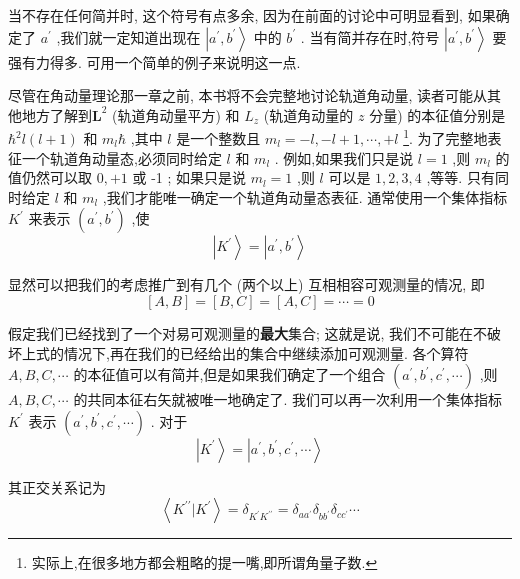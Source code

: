 \documentclass[lang=cn,newtx,10pt,scheme=chinese,thmcnt=section]{elegantbook}
\begin{document}
当不存在任何简并时, 这个符号有点多余, 因为在前面的讨论中可明显看到, 如果确定了 ${a}^{\prime }$ ,我们就一定知道出现在 $\left| {{a}^{\prime },{b}^{\prime }}\right\rangle$ 中的 ${b}^{\prime }$ . 当有简并存在时,符号 $\left| {{a}^{\prime },{b}^{\prime }}\right\rangle$ 要强有力得多. 可用一个简单的例子来说明这一点.

尽管在角动量理论那一章之前, 本书将不会完整地讨论轨道角动量, 读者可能从其他地方了解到${\mathbf{L}}^{2}$ (轨道角动量平方) 和 ${L}_{z}$ (轨道角动量的 $z$ 分量) 的本征值分别是 ${\hbar }^{2}l\left( {l + 1}\right)$ 和 ${m}_{l}\hbar$ ,其中 $l$ 是一个整数且 ${m}_{l} = - l, - l + 1,\cdots , + l$ \footnote{实际上,在很多地方都会粗略的提一嘴,即所谓角量子数.}. 为了完整地表征一个轨道角动量态,必须同时给定 $l$ 和 ${m}_{l}$ . 例如,如果我们只是说 $l = 1$ ,则 ${m}_{l}$ 的值仍然可以取 $0, + 1$ 或 -1 ; 如果只是说 ${m}_{l} = 1$ ,则 $l$ 可以是 $1,2,3,4$ ,等等. 只有同时给定 $l$ 和 ${m}_{l}$ ,我们才能唯一确定一个轨道角动量态表征. 通常使用一个集体指标 ${K}^{\prime }$ 来表示 $\left( {{a}^{\prime },{b}^{\prime }}\right)$ ,使
\begin{equation}
	\left| {K}^{\prime }\right\rangle = \left| {{a}^{\prime },{b}^{\prime }}\right\rangle
\end{equation}

显然可以把我们的考虑推广到有几个 (两个以上) 互相相容可观测量的情况, 即
\begin{equation}
	\left\lbrack {A, B}\right\rbrack = \left\lbrack {B, C}\right\rbrack = \left\lbrack {A, C}\right\rbrack = \cdots = 0
\end{equation}

假定我们已经找到了一个对易可观测量的\textbf{最大}集合; 这就是说, 我们不可能在不破坏上式的情况下,再在我们的已经给出的集合中继续添加可观测量. 各个算符 $A, B, C,\cdots$ 的本征值可以有简并,但是如果我们确定了一个组合 $\left( {{a}^{\prime },{b}^{\prime },{c}^{\prime },\cdots }\right)$ ,则 $A, B, C,\cdots$ 的共同本征右矢就被唯一地确定了. 我们可以再一次利用一个集体指标 ${K}^{\prime }$ 表示 $\left( {{a}^{\prime },{b}^{\prime },{c}^{\prime },\cdots }\right)$ . 对于
\begin{equation}
	\left| {K}^{\prime }\right\rangle = \left| {{a}^{\prime },{b}^{\prime },{c}^{\prime },\cdots }\right\rangle
\end{equation}

其正交关系记为
\begin{equation}
	\left\langle {{K}^{\prime \prime } | {K}^{\prime }}\right\rangle = {\delta }_{{K}^{\prime }{K}^{\prime \prime }} = {\delta }_{a{a}^{\prime }}{\delta }_{b{b}^{\prime }}{\delta }_{c{c}^{\prime }}\cdots
\end{equation}
\end{document}

